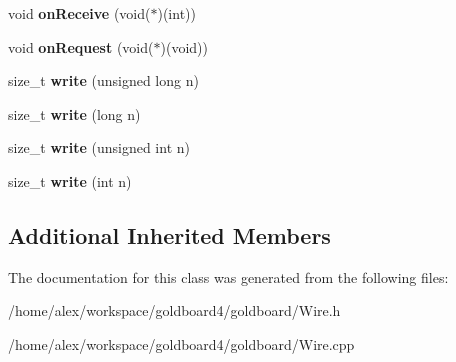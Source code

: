 \begin{DoxyCompactItemize}
\item 
void {\bfseries on\+Receive} (void($\ast$)(int))\hypertarget{class_two_wire_a860d97eb825c6fdca388f2f0577cc34a}{}\label{class_two_wire_a860d97eb825c6fdca388f2f0577cc34a}

\item 
void {\bfseries on\+Request} (void($\ast$)(void))\hypertarget{class_two_wire_a224bf8799dda398fc0db223801852ca5}{}\label{class_two_wire_a224bf8799dda398fc0db223801852ca5}

\item 
size\+\_\+t {\bfseries write} (unsigned long n)\hypertarget{class_two_wire_a0c9d09ead8fcddf2a84781fe77d3c975}{}\label{class_two_wire_a0c9d09ead8fcddf2a84781fe77d3c975}

\item 
size\+\_\+t {\bfseries write} (long n)\hypertarget{class_two_wire_a55a9894186458e43852f6fb7c59bb066}{}\label{class_two_wire_a55a9894186458e43852f6fb7c59bb066}

\item 
size\+\_\+t {\bfseries write} (unsigned int n)\hypertarget{class_two_wire_afdb917746ee37f72e7452b4782e9527b}{}\label{class_two_wire_afdb917746ee37f72e7452b4782e9527b}

\item 
size\+\_\+t {\bfseries write} (int n)\hypertarget{class_two_wire_a8ec34b0d2a75e8b2751eb9f4332bd7c3}{}\label{class_two_wire_a8ec34b0d2a75e8b2751eb9f4332bd7c3}

\end{DoxyCompactItemize}
\subsection*{Additional Inherited Members}


The documentation for this class was generated from the following files\+:\begin{DoxyCompactItemize}
\item 
/home/alex/workspace/goldboard4/goldboard/Wire.\+h\item 
/home/alex/workspace/goldboard4/goldboard/Wire.\+cpp\end{DoxyCompactItemize}
